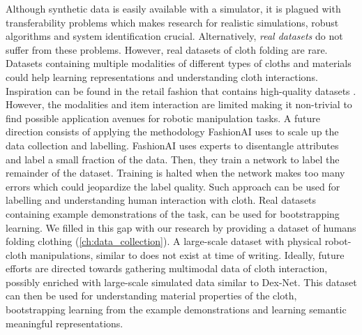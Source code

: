 \documentclass[\home/main.tex]{subfiles}
\begin{document}
Although synthetic data is easily available with a simulator, it is plagued with transferability problems which makes research for realistic simulations, robust algorithms and system identification crucial. Alternatively, \emph{real datasets} do not suffer from these problems. However, real datasets of cloth folding are rare. Datasets containing multiple modalities of different types of cloths and materials could help learning representations and understanding cloth interactions. Inspiration can be found in the retail fashion that contains high-quality datasets \autocite{DeepFashion, DeepFashion2, FashionAI}. However, the modalities and item interaction are limited making it non-trivial to find possible application avenues for robotic manipulation tasks. A future direction consists of applying the methodology FashionAI \autocite{FashionAI} uses to scale up the data collection and labelling. FashionAI uses experts to disentangle attributes and label a small fraction of the data. Then, they train a network to label the remainder of the dataset. Training is halted when the network makes too many errors which could jeopardize the label quality. Such approach can be used for labelling and understanding human interaction with cloth. 
Real datasets containing example demonstrations of the task, can be used for bootstrapping learning. We filled in this gap with our research by providing a dataset of humans folding clothing (\cref{ch:data_collection}). A large-scale dataset with physical robot-cloth manipulations, similar to \autocite{Levine2016} does not exist at time of writing. Ideally, future efforts are directed towards gathering multimodal data of cloth interaction, possibly enriched with large-scale simulated data similar to Dex-Net. This dataset can then be used for understanding material properties of the cloth, bootstrapping learning from the example demonstrations and learning semantic meaningful representations.
\end{document}
